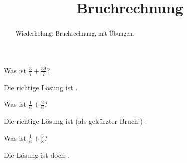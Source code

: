\documentclass{ximera}
\title{Bruchrechnung}
\begin{document}
\begin{abstract}
Wiederholung: Bruchrechnung, mit Übungen.
\end{abstract}
\maketitle

\begin{question}
Was ist $\frac 37 + \frac{39}{7}$?
\begin{solution}
Die richtige Lösung ist
.
\end{solution}
\end{question}

\begin{question}
Was ist $\frac{1}{6} + \frac{2}{6}$?
\begin{solution}
Die richtige Lösung ist (als gekürzter Bruch!)
.
\end{solution}
\end{question}

\begin{question}
Was ist $\frac{1}{6} + \frac{3}{8}$?
\begin{solution}
Die Lösung ist doch
.
\end{solution}
\end{question}
\end{document}
